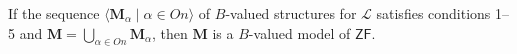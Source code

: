 If the sequence $\langle \mathbf{M}_{\alpha} \mid \alpha \in On \rangle$ of $B$-valued structures for $\mathcal{L}$ satisfies conditions 1--5 and $\mathbf{M} = \bigcup_{\alpha \in On} \mathbf{M}_{\alpha}$, then $\mathbf{M}$ is a $B$-valued model of $\mathsf{ZF}$.
